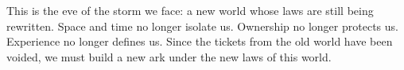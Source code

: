 \vspace{0.8em}

This is the eve of the storm we face: a new world whose laws are still being rewritten. Space and time no longer isolate us. Ownership no longer protects us. Experience no longer defines us. Since the tickets from the old world have been voided, we must build a new ark under the new laws of this world.

\setcounter{chapter}{0}
